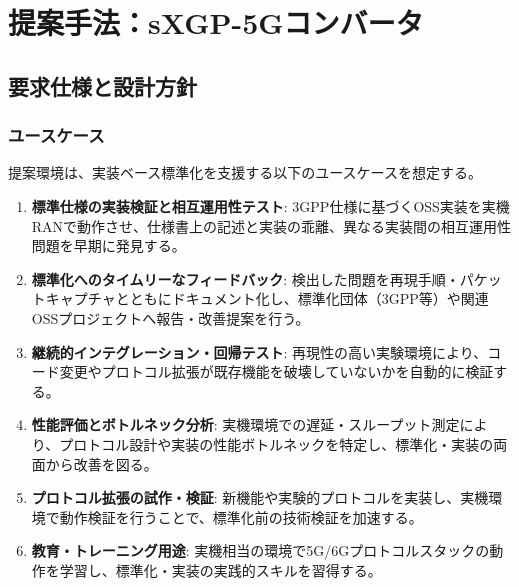 \chapter{提案手法：sXGP-5Gコンバータ}
\label{chap:proposal}

\section{要求仕様と設計方針}
\subsection{ユースケース}
提案環境は、実装ベース標準化を支援する以下のユースケースを想定する。

\begin{enumerate}
	\item \textbf{標準仕様の実装検証と相互運用性テスト}: 3GPP仕様に基づくOSS実装を実機RANで動作させ、仕様書上の記述と実装の乖離、異なる実装間の相互運用性問題を早期に発見する。

	\item \textbf{標準化へのタイムリーなフィードバック}: 検出した問題を再現手順・パケットキャプチャとともにドキュメント化し、標準化団体（3GPP等）や関連OSSプロジェクトへ報告・改善提案を行う。

	\item \textbf{継続的インテグレーション・回帰テスト}: 再現性の高い実験環境により、コード変更やプロトコル拡張が既存機能を破壊していないかを自動的に検証する。

	\item \textbf{性能評価とボトルネック分析}: 実機環境での遅延・スループット測定により、プロトコル設計や実装の性能ボトルネックを特定し、標準化・実装の両面から改善を図る。

	\item \textbf{プロトコル拡張の試作・検証}: 新機能や実験的プロトコルを実装し、実機環境で動作検証を行うことで、標準化前の技術検証を加速する。

	\item \textbf{教育・トレーニング用途}: 実機相当の環境で5G/6Gプロトコルスタックの動作を学習し、標準化・実装の実践的スキルを習得する。
\end{enumerate}

